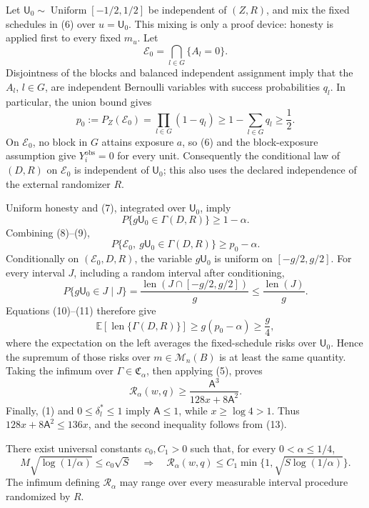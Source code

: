 Let \(\mathsf U_0\sim\operatorname{Uniform}[-1/2,1/2]\) be independent
of \((Z,R)\), and mix the fixed schedules in (6) over \(u=\mathsf U_0\).
This mixing is only a proof device: honesty is applied first to every
fixed \(m_u\).  Let
\[
 \mathcal E_0=\bigcap_{l\in G}\{A_l=0\}.
\]
Disjointness of the blocks and balanced independent assignment imply
that the \(A_l\), \(l\in G\), are independent Bernoulli variables with
success probabilities \(q_l\).  In particular, the union bound gives
\[
 p_0:=P_Z(\mathcal E_0)
 =\prod_{l\in G}(1-q_l)
 \ge1-\sum_{l\in G}q_l
 \ge\frac12.
\tag{8}
\]
On \(\mathcal E_0\), no block in \(G\) attains exposure \(a\), so (6)
and the block-exposure assumption give \(Y_i^{\mathrm{obs}}=0\) for
every unit.  Consequently the conditional law of \((D,R)\) on
\(\mathcal E_0\) is independent of \(\mathsf U_0\); this also uses the
declared independence of the external randomizer \(R\).

Uniform honesty and (7), integrated over \(\mathsf U_0\), imply
\[
 P\{g\mathsf U_0\in\Gamma(D,R)\}\ge1-\alpha.
\tag{9}
\]
Combining (8)--(9),
\[
 P\{\mathcal E_0,\ g\mathsf U_0\in\Gamma(D,R)\}
 \ge p_0-\alpha.
\tag{10}
\]
Conditionally on \((\mathcal E_0,D,R)\), the variable
\(g\mathsf U_0\) is uniform on \([-g/2,g/2]\).  For every interval
\(J\), including a random interval after conditioning,
\[
 P\{g\mathsf U_0\in J\mid J\}
 =\frac{\operatorname{len}(J\cap[-g/2,g/2])}{g}
 \le\frac{\operatorname{len}(J)}{g}.
\tag{11}
\]
Equations (10)--(11) therefore give
\[
 \mathbb E\!\left[\operatorname{len}\{\Gamma(D,R)\}\right]
 \ge g(p_0-\alpha)
 \ge\frac g4,
\tag{12}
\]
where the expectation on the left averages the fixed-schedule risks
over \(\mathsf U_0\).  Hence the supremum of those risks over
\(m\in\mathcal M_n(B)\) is at least the same quantity.  Taking the
infimum over \(\Gamma\in\mathfrak C_\alpha\), then applying (5), proves
\[
 \mathcal R_\alpha(w,q)
 \ge\frac{\mathsf A^3}{128x+8\mathsf A^2}.
\tag{13}
\]
Finally, (1) and \(0\le\delta_l^*\le1\) imply
\(\mathsf A\le1\), while \(x\ge\log4>1\).  Thus
\(128x+8\mathsf A^2\le136x\), and the second inequality follows from
(13).

There exist universal constants \(c_0,C_1>0\) such that, for every
\(0<\alpha\le1/4\),
\[
 M\sqrt{\log(1/\alpha)}\le c_0\sqrt S
 \quad\Longrightarrow\quad
 \mathcal R_\alpha(w,q)
 \le C_1\min\{1,\sqrt{S\log(1/\alpha)}\}.
\]
The infimum defining \(\mathcal R_\alpha\) may range over every
measurable interval procedure randomized by \(R\).

